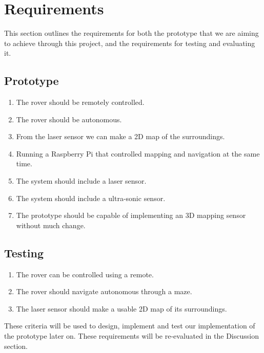 \section{Requirements}

This section outlines the requirements for both the prototype that we are aiming to achieve through this project, and the requirements for testing and evaluating it.

\subsection{Prototype}

\begin{enumerate}
	
	\item The rover should be remotely controlled.
	\item The rover should be autonomous.
	\item From the laser sensor we can make a 2D map of the surroundings.
	\item Running a Raspberry Pi that controlled mapping and navigation at the same time.
	\item The system should include a laser sensor.
	\item The system should include a ultra-sonic sensor.
 	\item The prototype should be capable of implementing an 3D mapping sensor without much change.
	
\end{enumerate}

\subsection{Testing}

\begin{enumerate}
	
	\item The rover can be controlled using a remote.
	\item The rover should navigate autonomous through a maze.
	\item The laser sensor should make a usable 2D map of its surroundings.
	
\end{enumerate}

These criteria will be used to design, implement and test our implementation of the prototype later on. These requirements will be re-evaluated in the Discussion section.